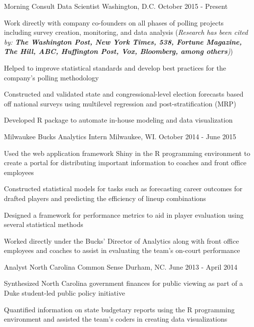 \documentclass[11pt, a4paper]{awesome-cv}
\begin{document}
\begin{cventries}
  \cventry
    {Morning Consult}
    {Data Scientist}
    {Washington, D.C.}
    {October 2015 - Present}
    {
      \begin{cvitems}
        \item{Work directly with company co-founders on all phases of polling projects including survey creation,
        monitoring, and data analysis (\textit{Research has been cited by: \textbf{The Washington Post, New York Times, 538, Fortune Magazine, The Hill, ABC, Huffington Post, Vox, Bloomberg, among others})})}
        \item{Helped to improve statistical standards and develop best practices for the company’s polling methodology}
        \item{Constructed and validated state and congressional-level election forecasts based off national surveys using multilevel regression and post-stratification (MRP)}
        \item{Developed R package to automate in-house modeling and data visualization}
      \end{cvitems}
    }
  \cventry
    {Milwaukee Bucks}
    {Analytics Intern}
    {Milwaukee, WI.}
    {October 2014 - June 2015}
    {
      \begin{cvitems}
        \item{Used the web application framework Shiny in the R programming environment to create a portal for distributing important information to coaches and front office employees}
        \item{Constructed statistical models for tasks such as forecasting career outcomes for drafted players
and predicting the efficiency of lineup combinations}
         \item{Designed a framework for performance metrics to aid in player evaluation using several statistical
methods}
        \item{Worked directly under the Bucks’ Director of Analytics along with front office employees and
coaches to assist in evaluating the team’s on-court performance}
      \end{cvitems}
    }
  \cventry
    {Analyst}
    {North Carolina Common Sense}
    {Durham, NC.}
    {June 2013 - April 2014}
    {
      \begin{cvitems}
        \item{Synthesized North Carolina government finances for public viewing as part of a Duke student-led
public policy initiative}
        \item{Quantified information on state budgetary reports using the R programming environment and
assisted the team’s coders in creating data visualizations}
      \end{cvitems} 
    }
    

\end{cventries}
\end{document}
